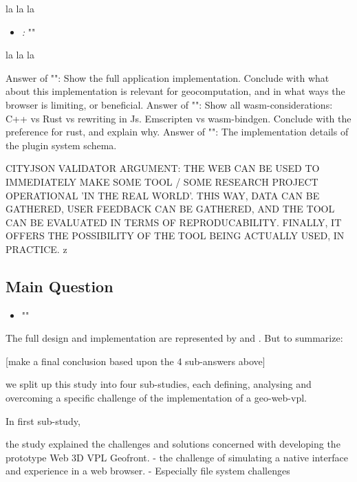 la la la

\begin{itemize}[ ]
  \item \emph{\mySubRQFourTitle:} "\mySubRQFour"
\end{itemize}

la la la

\subitem Answer of "\mySubRQOneTitle": Show the full application implementation. Conclude with what about this implementation is relevant for geocomputation, and in what ways the browser is limiting, or beneficial. 
\subitem Answer of "\mySubRQTwoTitle": Show all wasm-considerations: C++ vs Rust vs rewriting in Js. Emscripten vs wasm-bindgen. Conclude with the preference for rust, and explain why.
\subitem Answer of "\mySubRQThreeTitle": The implementation details of the plugin system schema. 


CITYJSON VALIDATOR ARGUMENT: THE WEB CAN BE USED TO IMMEDIATELY MAKE SOME TOOL / SOME RESEARCH PROJECT OPERATIONAL 'IN THE REAL WORLD'. THIS WAY, DATA CAN BE GATHERED, USER FEEDBACK CAN BE GATHERED, AND THE TOOL CAN BE EVALUATED IN TERMS OF REPRODUCABILITY. FINALLY, IT OFFERS THE POSSIBILITY OF THE TOOL BEING ACTUALLY USED, IN PRACTICE. 
z

\subsection*{Main Question}

\begin{itemize}[ ]
    \item "\myMainRQ"
\end{itemize}

The full design and implementation are represented by  and . 
But to summarize:

[make a final conclusion based upon the 4 sub-answers above]

we split up this study into four sub-studies, each defining, analysing and overcoming a specific challenge of the implementation of a \ac{geo-web-vpl}.

In first sub-study, 

the study explained the challenges and solutions concerned with developing the prototype Web 3D VPL Geofront.
- the challenge of simulating a native interface and experience in a web browser. 
- Especially file system challenges 

